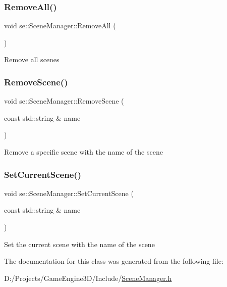 \subsubsection{\texorpdfstring{Remove\+All()}{RemoveAll()}}
{\footnotesize\ttfamily void se\+::\+Scene\+Manager\+::\+Remove\+All (\begin{DoxyParamCaption}{ }\end{DoxyParamCaption})}

Remove all scenes \mbox{\label{classse_1_1_scene_manager_a7912dae18fcbfff00194a63b88aec179}} 
\subsubsection{\texorpdfstring{Remove\+Scene()}{RemoveScene()}}
{\footnotesize\ttfamily void se\+::\+Scene\+Manager\+::\+Remove\+Scene (\begin{DoxyParamCaption}\item[{const std\+::string \&}]{name }\end{DoxyParamCaption})}

Remove a specific scene with the name of the scene \mbox{\label{classse_1_1_scene_manager_a8eff0a05036942247f81fe4915ffce50}} 
\subsubsection{\texorpdfstring{Set\+Current\+Scene()}{SetCurrentScene()}}
{\footnotesize\ttfamily void se\+::\+Scene\+Manager\+::\+Set\+Current\+Scene (\begin{DoxyParamCaption}\item[{const std\+::string \&}]{name }\end{DoxyParamCaption})}

Set the current scene with the name of the scene 

The documentation for this class was generated from the following file\+:\begin{DoxyCompactItemize}
\item 
D\+:/\+Projects/\+Game\+Engine3\+D/\+Include/\mbox{\hyperlink{_scene_manager_8h}{Scene\+Manager.\+h}}\end{DoxyCompactItemize}
